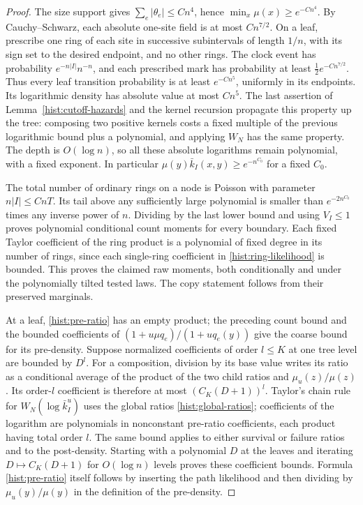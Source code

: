 \begin{proof}
The size support gives $\sum_e|\theta_e|\le Cn^4$, hence
$\min_x\mu(x)\ge e^{-Cn^4}$.  By Cauchy--Schwarz, each absolute one-site
field is at most $Cn^{7/2}$.
On a leaf, prescribe one ring of each site in successive subintervals of
length $1/n$, with its sign set to the desired endpoint, and no other rings.
The clock event has probability $e^{-n|I|}n^{-n}$, and each prescribed mark
has probability at least $\tfrac12e^{-Cn^{7/2}}$.  Thus every leaf transition
probability is at least $e^{-Cn^5}$, uniformly in its endpoints.  Its
logarithmic density has absolute value at most $Cn^5$.  The last assertion of
Lemma~\ref{hist:cutoff-hazards} and the kernel recursion propagate this property
up the tree: composing two positive kernels costs a fixed multiple of the
previous logarithmic bound plus a polynomial, and applying $W_N$ has the
same property.  The depth is $O(\log n)$, so all these absolute logarithms
remain polynomial, with a fixed exponent.  In particular
$\mu(y)\bar k_I(x,y)\ge e^{-n^{C_0}}$ for a fixed $C_0$.

The total number of ordinary rings on a node is Poisson with parameter
$n|I|\le CnT$.  Its tail above any sufficiently large polynomial is smaller
than $e^{-2n^{C_0}}$ times any inverse power of $n$.  Dividing by the last
lower bound and using $V_I\le1$ proves polynomial conditional count moments
for every boundary.  Each fixed Taylor coefficient of the ring product is
a polynomial of fixed degree in its number of rings, since each single-ring
coefficient in \eqref{hist:ring-likelihood} is bounded.  This proves the
claimed raw moments, both conditionally and under the polynomially tilted
tested laws.  The copy statement follows from their preserved marginals.

At a leaf, \eqref{hist:pre-ratio} has an empty product; the preceding count
bound and the bounded coefficients of $(1+u\mu q_e)/(1+u q_e(y))$ give
the coarse bound for its pre-density.  Suppose normalized coefficients of
order $l\le K$ at one tree level are bounded by $D^l$.  For a composition,
division by its base value writes its ratio as a conditional average of the
product of the two child ratios and $\mu_u(z)/\mu(z)$.  Its order-$l$
coefficient is therefore at most $(C_K(D+1))^l$.  Taylor's chain rule for
$W_N(\log\bar k_I^u)$ uses the global ratios
\eqref{hist:global-ratios}; coefficients of the logarithm are polynomials
in nonconstant pre-ratio coefficients, each product having total order $l$.
The same bound applies to either survival or failure ratios and to the
post-density.  Starting with a polynomial $D$ at the leaves and iterating
$D\mapsto C_K(D+1)$ for $O(\log n)$ levels proves these coefficient bounds.  Formula
\eqref{hist:pre-ratio} itself follows by inserting the path likelihood and
then dividing by $\mu_u(y)/\mu(y)$ in the definition of the pre-density.


\end{proof}
